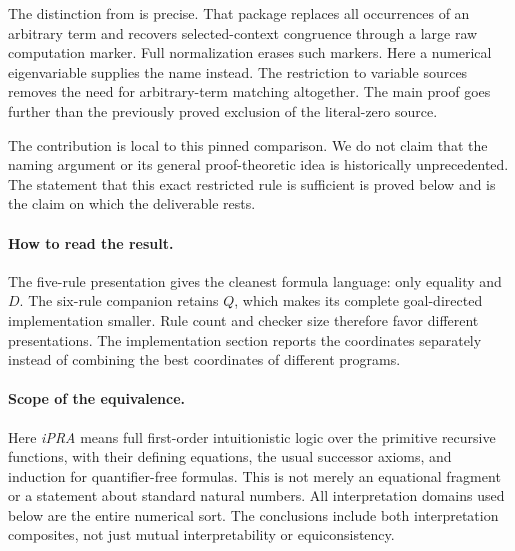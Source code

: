 \documentclass[11pt]{article}
\theoremstyle{definition}
\theoremstyle{remark}
\newcommand{\code}[1]{\texttt{\detokenize{#1}}}
\begin{document}
The distinction from \code{template_free} is precise. That package replaces
all occurrences of an arbitrary term and recovers selected-context congruence
through a large raw computation marker. Full normalization erases such
markers. Here a numerical eigenvariable supplies the name instead.
The restriction to variable sources removes the need for arbitrary-term
matching altogether. The main proof goes further than the previously
proved exclusion of the literal-zero source.

The contribution is local to this pinned comparison. We do not claim
that the naming argument or its general proof-theoretic idea is historically
unprecedented. The statement that this exact restricted rule is sufficient
is proved below and is the claim on which the deliverable rests.

\paragraph{How to read the result.}
The five-rule presentation gives the cleanest formula language: only equality
and $D$. The six-rule companion retains $Q$, which makes its complete
goal-directed implementation smaller. Rule count and checker size therefore
favor different presentations. The implementation section reports the
coordinates separately instead of combining the best coordinates of
different programs.

\paragraph{Scope of the equivalence.}
Here \emph{iPRA} means full first-order intuitionistic logic over the primitive
recursive functions, with their defining equations, the usual successor
axioms, and induction for quantifier-free formulas. This is not merely
an equational fragment or a statement about standard natural numbers.
All interpretation domains used below are the entire numerical sort.
The conclusions include both interpretation composites, not just mutual
interpretability or equiconsistency.
\end{document}
